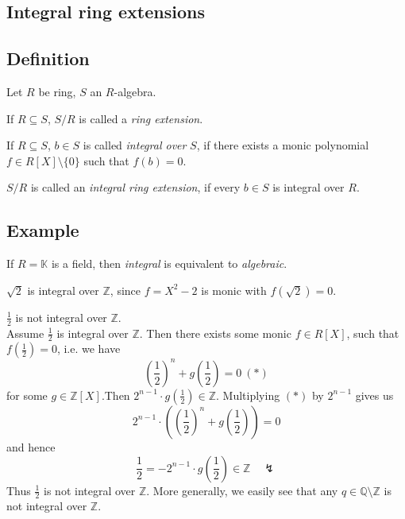 \documentclass[12pt]{book}
\begin{document}
\begin{spacing}{1.3}

\renewcommand*\thesection{§ \arabic{section}\quad }
\section{Integral ring extensions}
\renewcommand*\thesection{\arabic{section}}

\subsection{Definition} %
Let $R$ be ring, $S$ an $R$-algebra.
\begin{compactenum}
\item If $R\subseteq S$, $S/R$ is called a \textit{ring extension}.
\item If $R\subseteq S$, $b \in S$ is called \textit{integral over} $S$, if there exists a monic polynomial $f \in R[X]\setminus \{0\}$ such that $f(b)=0$.
\item $S/R$ is called an \textit{integral ring extension}, if every $b \in S$ is integral over $R$.
\end{compactenum}

\subsection*{Example} %
\titleformat{\subsection}{\normalfont\normalsize\bfseries}{}{0em}{#1 \thesubsection}
\begin{compactenum}
\item If $R= \mathbb{K}$ is a field, then \textit{integral} is equivalent to \textit{algebraic}.
\item $\sqrt{2}$ is integral over $\mathbb{Z}$, since $f=X^2-2$ is monic with $f(\sqrt{2})=0$.
\item $\frac{1}{2}$ is not integral over $\mathbb{Z}$.\\
Assume $\frac{1}{2}$ is integral over $\mathbb{Z}$. Then there exists some monic $f \in R[X]$, such that $f\left(\frac{1}{2}\right)=0$, i.e. we have
$$\left(\frac{1}{2}\right)^n+g\left(\frac{1}{2}\right) =0 \ (*)$$
for some $g \in \mathbb{Z}[X]$.Then $2^{n-1} \cdot g\left(\frac{1}{2}\right) \in \mathbb{Z}$. Multiplying $(*)$ by $2^{n-1}$ gives us
$$2^{n-1} \cdot \left(\left(\frac{1}{2}\right)^n+g\left(\frac{1}{2}\right)\right)=0$$
and hence
$$ \frac{1}{2}=-2^{n-1} \cdot g\left(\frac{1}{2}\right) \in \mathbb{Z} \quad \lightning$$
Thus $\frac{1}{2}$ is not integral over $\mathbb{Z}$. More generally, we easily see that any $q \in \mathbb{Q} \setminus \mathbb{Z}$ is not integral over $\mathbb{Z}$.
\end{compactenum}


\end{spacing}
\end{document}
